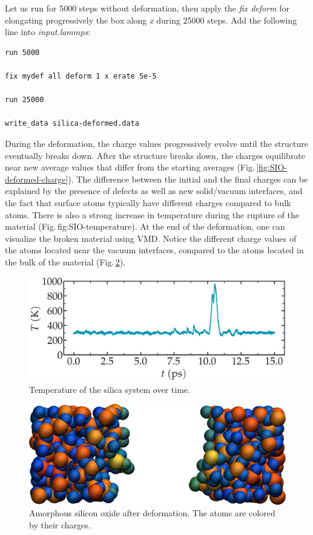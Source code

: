 \documentclass[9pt,tutorial]{livecoms}
\begin{document}
Let us run for 5000 steps without deformation, then apply the \textit{fix deform} for elongating progressively the box along \textit{x} during 25000 steps. Add the following line into \textit{input.lammps}:
{\normalsize \begin{verbatim}
run 5000

fix mydef all deform 1 x erate 5e-5

run 25000

write_data silica-deformed.data
\end{verbatim}}
During the deformation, the charge values progressively evolve until the structure eventually breaks down. After the structure breaks down, the charges equilibrate near new average values that differ from the starting averages (Fig.\,\ref{fig:SIO-deformed-charge}). The difference between the initial and the final charges can be explained by the presence of defects as well as new solid/vacuum interfaces, and the fact that surface atoms typically have different charges compared to bulk atoms. There is also a strong increase in temperature during the rupture of the material (Fig.\,{fig:SIO-temperature}). At the end of the deformation, one can visualize the broken material using VMD. Notice the different charge values of the atoms located near the vacuum interfaces, compared to the atoms located in the bulk of the material (Fig.\,\ref{fig:SIO-deformed}).

\begin{figure}
\includegraphics[width=\linewidth]{SIO-temperature}
\caption{Temperature of the silica system over time.}
\label{fig:SIO-temperature}
\end{figure}

\begin{figure}
\includegraphics[width=\linewidth]{SIO-deformed}
\caption{Amorphous silicon oxide after deformation. The atoms are colored by their charges.}
\label{fig:SIO-deformed}
\end{figure}
\end{document}
